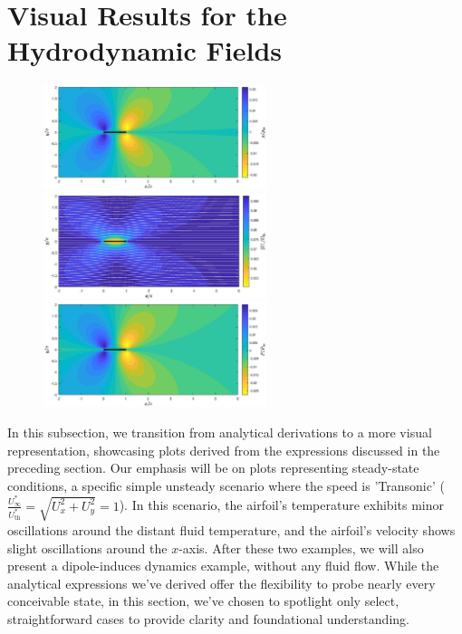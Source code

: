 \section{Visual Results for the Hydrodynamic Fields}
\begin{figure}
\caption{}
    \includegraphics[width=0.58\textwidth]{drawings/SS_U.1_density.eps}
    \vspace{0.07cm}
    \includegraphics[width=0.58\textwidth]{drawings/SS_U.1_velocity.eps}
    \vspace{0.07cm}
    \includegraphics[width=0.58\textwidth]{drawings/SS_U.1_pressure.eps}
    \vspace{0.07cm}
    \begin{minipage}{0.58\textwidth}
    \end{minipage}
    \label{fig:steady_state}
\end{figure}

In this subsection, we transition from analytical derivations to a more visual representation, showcasing plots derived from the expressions discussed in the preceding section. Our emphasis will be on plots representing steady-state conditions, a specific simple unsteady scenario where the speed is 'Transonic' ($\frac{U_\infty^*}{U_{\mathrm{th}}^*} = \sqrt{U_x^2 + U_y^2} = 1$). In this scenario, the airfoil's temperature exhibits minor oscillations around the distant fluid temperature, and the airfoil's velocity shows slight oscillations around the $x$-axis. After these two examples, we will also present a dipole-induces dynamics example, without any fluid flow. While the analytical expressions we've derived offer the flexibility to probe nearly every conceivable state, in this section, we've chosen to spotlight only select, straightforward cases to provide clarity and foundational understanding.

